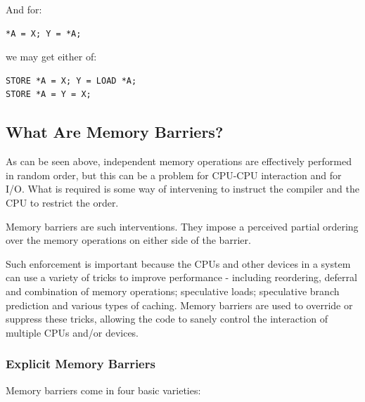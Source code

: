 \begin{enumerate}
	And for:

\vspace{5pt}
\begin{minipage}[t]{\columnwidth}
\small
\begin{verbatim}
*A = X; Y = *A;
\end{verbatim}
\end{minipage}
\vspace{5pt}

	we may get either of:

\vspace{5pt}
\begin{minipage}[t]{\columnwidth}
\small
\begin{verbatim}
STORE *A = X; Y = LOAD *A;
STORE *A = Y = X;
\end{verbatim}
\end{minipage}
\vspace{5pt}

\end{enumerate}

\subsection{What Are Memory Barriers?}
\label{sec:advsync:What Are Memory Barriers?}

As can be seen above, independent memory operations are effectively performed
in random order, but this can be a problem for CPU-CPU interaction and for I/O.
What is required is some way of intervening to instruct the compiler and the
CPU to restrict the order.

Memory barriers are such interventions.  They impose a perceived partial
ordering over the memory operations on either side of the barrier.

Such enforcement is important because the CPUs and other devices in a system
can use a variety of tricks to improve performance - including reordering,
deferral and combination of memory operations; speculative loads; speculative
branch prediction and various types of caching.  Memory barriers are used to
override or suppress these tricks, allowing the code to sanely control the
interaction of multiple CPUs and/or devices.

\subsubsection{Explicit Memory Barriers}
\label{sec:advsync:Explicit Memory Barriers}

Memory barriers come in four basic varieties:

